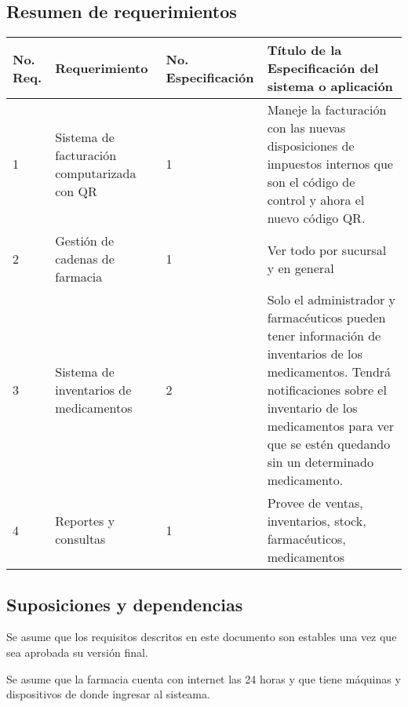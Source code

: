 \subsection{Resumen de requerimientos}
\begin{table}[h]
\begin{tabular}{lp{4cm}lp{6cm}}
\hline
\textbf{No. Req.} & \textbf{Requerimiento}                      & \textbf{No. Especificación} & \textbf{Título de la Especificación del sistema o aplicación}                                                                                                                                                                   \\ \hline
1                 & Sistema de facturación computarizada con QR & 1                           & Maneje la facturación con las nuevas disposiciones de impuestos internos que son el código de control y ahora el nuevo código QR.                                                                                               \\
2                 & Gestión de  cadenas de farmacia    & 1                           & Ver todo por sucursal y en general                                                                                                                                                                                              \\
3                 & Sistema de inventarios de medicamentos      & 2                           & Solo el administrador y farmacéuticos pueden tener información de inventarios de los medicamentos. Tendrá notificaciones sobre el inventario de los medicamentos para ver que se estén quedando sin un determinado medicamento. \\
4                 & Reportes y consultas                        & 1                           & Provee de ventas, inventarios, stock, farmacéuticos, medicamentos                                                                                                                                                               \\ \hline
\end{tabular}
\end{table}
\subsection{Suposiciones y dependencias}
Se asume que los requisitos descritos en este documento son estables una vez que sea aprobada su versión final.

Se asume que la farmacia cuenta con internet las 24 horas y que tiene máquinas y dispositivos de donde ingresar al sisteama.